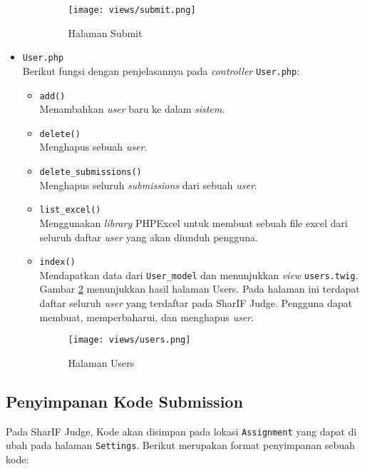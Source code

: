 \begin{itemize}
\begin{itemize}
		            \begin{figure}[H]
			            \centering
			            \texttt{[image: views/submit.png]}
			            \caption{Halaman Submit}
			            \label{fig:3:1:1:submit}
		            \end{figure}

	      \end{itemize}

	\item \verb|User.php| \\
	      Berikut fungsi dengan penjelasannya pada \textit{controller} \verb|User.php|:

	      \begin{itemize}
		      \item \verb|add()| \\
		            Menambahkan \textit{user} baru ke dalam \textit{sistem}.
		      \item \verb|delete()| \\
		            Menghapus sebuah \textit{user}.
		      \item \verb|delete_submissions()| \\
		            Menghapus seluruh \textit{submissions} dari sebuah \textit{user}.
		      \item \verb|list_excel()| \\
		            Menggunakan \textit{library} PHPExcel untuk membuat sebuah file excel dari seluruh daftar \textit{user} yang akan diunduh pengguna.
		      \item \verb|index()| \\
		            Mendapatkan data dari \verb|User_model| dan menunjukkan \textit{view} \verb|users.twig|. Gambar \ref{fig:3:1:1:users} menunjukkan hasil halaman Users. Pada halaman ini terdapat daftar seluruh \textit{user} yang terdaftar pada SharIF Judge. Pengguna dapat membuat, memperbaharui, dan menghapus \textit{user}.

		            \begin{figure}[H]
			            \centering
			            \texttt{[image: views/users.png]}
			            \caption{Halaman Users}
			            \label{fig:3:1:1:users}
		            \end{figure}


	      \end{itemize}

\end{itemize}

\subsection{Penyimpanan Kode Submission}
\label{sub:3:1:penyimpanankode}
Pada SharIF Judge, Kode akan disimpan pada lokasi \verb|Assignment| yang dapat di ubah pada halaman \verb|Settings|. Berikut merupakan format penyimpanan sebuah kode:

